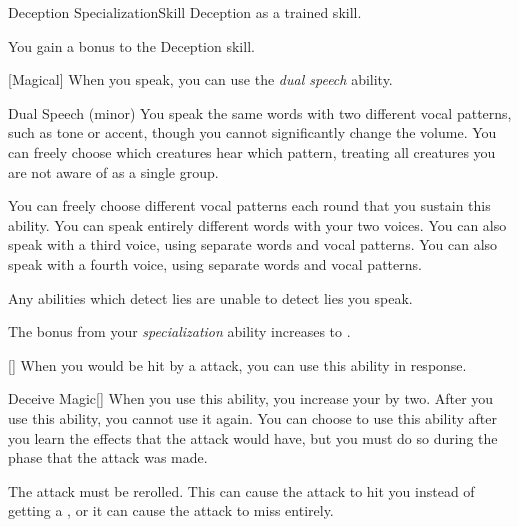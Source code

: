     \begin{feat}{Deception Specialization}{Skill}
        \featpre Deception as a trained skill.

         You gain a  bonus to the Deception skill.

        [Magical] When you speak, you can use the \textit{dual speech} ability.
        \begin{sustainability}{Dual Speech}{ (minor)}
            \rankline
            You speak the same words with two different vocal patterns, such as tone or accent, though you cannot significantly change the volume.
            You can freely choose which creatures hear which pattern, treating all creatures you are not aware of as a single group. 

            You can freely choose different vocal patterns each round that you sustain this ability.
            \rankline
             You can speak entirely different words with your two voices.
             You can also speak with a third voice, using separate words and vocal patterns.
             You can also speak with a fourth voice, using separate words and vocal patterns.
        \end{sustainability}

         Any  abilities which detect lies are unable to detect lies you speak.

         The bonus from your \textit{specialization} ability increases to .

        [] When you would be hit by a  attack, you can use this ability in response.
        \begin{activeability}{Deceive Magic}[]
            \rankline
            When you use this ability, you increase your  by two.
            After you use this ability, you  cannot use it again.
            You can choose to use this ability after you learn the effects that the attack would have, but you must do so during the phase that the attack was made.

            The attack must be rerolled.
            This can cause the attack to hit you instead of getting a , or it can cause the attack to miss entirely.
        \end{activeability}
    \end{feat}

